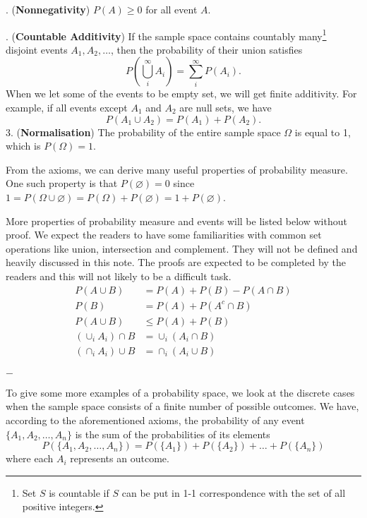 \documentclass[11pt, a4paper, oneside]{book}
\theoremstyle{definition}
\newcommand{\breaking}{%
    \begin{center}
    $-$
    \end{center}%
}
\begin{document}
. (\textbf{Nonnegativity}) $P(A) \ge 0$ for all event $A$.

. (\textbf{Countable Additivity}) If the sample space contains countably many\footnote{Set $S$ is countable if $S$ can be put in 1-1 correspondence with the set of all positive integers.} disjoint events $A_1, A_2, \dots$, then the probability of their union satisfies\[
P(\bigcup_{i}^{\infty}A_i)=\sum_{i}^{\infty}P(A_i).
\]
When we let some of the events to be empty set, we will get finite additivity. For example, if all events except $A_1$ and $A_2$ are null sets, we have \[
P(A_1\cup A_2) = P(A_1) + P(A_2). 
\]
3. (\textbf{Normalisation}) The probability of the entire sample space $\Omega$ is equal to 1, which is $P(\Omega) = 1$.

\noindent From the axioms, we can derive many useful properties of probability measure. One such property is that $P(\varnothing) = 0$ since $1 = P(\Omega \cup \varnothing) = P(\Omega) + P(\varnothing) = 1 + P(\varnothing)$.    

\noindent More properties of probability measure and events will be listed below without proof. We expect the readers to have some familiarities with common set operations like union, intersection and complement. They will not be defined and heavily discussed in this note. The proofs are expected to be completed by the readers and this will not likely to be a difficult task. 
\begin{equation*}
\begin{split}
P(A \cup B) &= P(A) + P(B) - P(A \cap B) \\
P(B) &= P(A) + P(A^c \cap B)\\
P(A \cup B) &\le P(A) + P(B) \\
(\cup_i A_i)\cap B &= \cup_i (A_i \cap B) \\
(\cap_i A_i)\cup B &= \cap_i (A_i \cup B) \\
\end{split}
\end{equation*}

\breaking

\noindent To give some more examples of a probability space, we look at the discrete cases when the sample space consists of a finite number of possible outcomes. We have, according to the aforementioned axioms, the probability of any event $\{A_1, A_2, \dots, A_n\}$ is the sum of the probabilities of its elements\[
P(\{A_1, A_2, \dots, A_n\}) = P(\{A_1\}) +P(\{A_2\}) + \dots + P(\{A_n\})
\]
where each $A_i$ represents an outcome.
\end{document}
